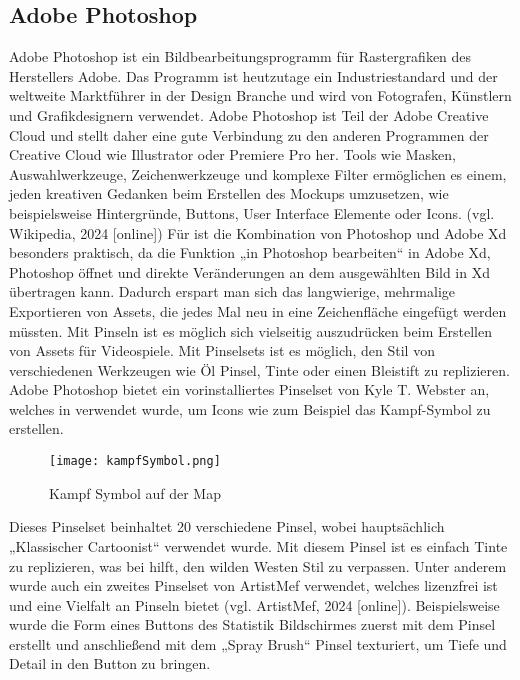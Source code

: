 \subsection{Adobe Photoshop}

Adobe Photoshop ist ein Bildbearbeitungsprogramm für Rastergrafiken des Herstellers Adobe. Das Programm ist heutzutage ein Industriestandard und der weltweite Marktführer in der Design Branche und wird von Fotografen, Künstlern und Grafikdesignern verwendet. Adobe Photoshop ist Teil der Adobe Creative Cloud und stellt daher eine gute Verbindung zu den anderen Programmen der Creative Cloud wie Illustrator oder Premiere Pro her. Tools wie Masken, Auswahlwerkzeuge, Zeichenwerkzeuge und komplexe Filter ermöglichen es einem, jeden kreativen Gedanken beim Erstellen des \FF Mockups umzusetzen, wie beispielsweise Hintergründe, Buttons, User Interface Elemente oder Icons. (vgl. Wikipedia, 2024 [online])
Für \FF ist die Kombination von Photoshop und Adobe Xd besonders praktisch, da die Funktion „in Photoshop bearbeiten“ in Adobe Xd, Photoshop öffnet und direkte Veränderungen an dem ausgewählten Bild in Xd übertragen kann. Dadurch erspart man sich das langwierige, mehrmalige Exportieren von Assets, die jedes Mal neu in eine Zeichenfläche eingefügt werden müssten.
Mit Pinseln ist es möglich sich vielseitig auszudrücken beim Erstellen von Assets für Videospiele. Mit Pinselsets ist es möglich, den Stil von verschiedenen Werkzeugen wie Öl Pinsel, Tinte oder einen Bleistift zu replizieren. Adobe Photoshop bietet ein vorinstalliertes Pinselset von Kyle T. Webster an, welches in \FF verwendet wurde, um Icons wie zum Beispiel das Kampf-Symbol zu erstellen.

\begin{figure}[H]
    \centering
    \texttt{[image: kampfSymbol.png]}
    \caption{Kampf Symbol auf der Map}
\end{figure}

Dieses Pinselset beinhaltet 20 verschiedene Pinsel, wobei hauptsächlich „Klassischer Cartoonist“ verwendet wurde. Mit diesem Pinsel ist es einfach Tinte zu replizieren, was bei \FF hilft, den wilden Westen Stil zu verpassen. Unter anderem wurde auch ein zweites Pinselset von ArtistMef verwendet, welches lizenzfrei ist und eine Vielfalt an Pinseln bietet (vgl. ArtistMef, 2024 [online]). Beispielsweise wurde die Form eines Buttons des Statistik Bildschirmes zuerst mit dem
 Pinsel erstellt und anschließend mit dem „Spray Brush“ Pinsel texturiert, um Tiefe und Detail in den Button zu bringen.

